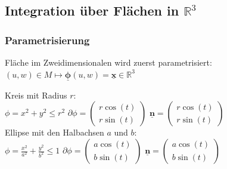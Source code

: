 \documentclass[6pt,a4paper]{scrartcl}
\newcommand{\vect}[1]{\ensuremath{\begin{pmatrix} #1 \end{pmatrix}}}			%
\renewcommand{\vec}[1]{\ensuremath{\underline{\boldsymbol {#1}}}}
\newcommand{\R}{\ensuremath{\mathbb R}}
\begin{document}
\begin{multicols}{4}
		\subsection{Integration über Flächen in $\R^3$}
		
		\subsubsection{Parametrisierung}
		Fläche im Zweidimensionalen wird zuerst parametrisiert:\\
		$(u,w) \in M \mapsto \vec{\phi}(u,w) = \vec{x} \in \R^3$
		
		Kreis mit Radius $r$:\\
		$\phi = x^2 + y^2 \le r^2$ \qquad $\partial \phi = \vect{r \cos(t)\\ r \sin(t)}$ \quad $\vec n = \vect{r \cos(t)\\ r \sin(t)}$\\[0.5em]
		Ellipse mit den Halbachsen $a$ und $b$:\\
		$\phi = \frac{x^2}{a^2} + \frac{y^2}{b^2} \le 1$ \qquad $\partial \phi = \vect{ a \cos(t) \\  b \sin(t)}$ \quad $\vec n = \vect{ a \cos(t) \\ b \sin(t)}$
		

\end{multicols}
\end{document}
